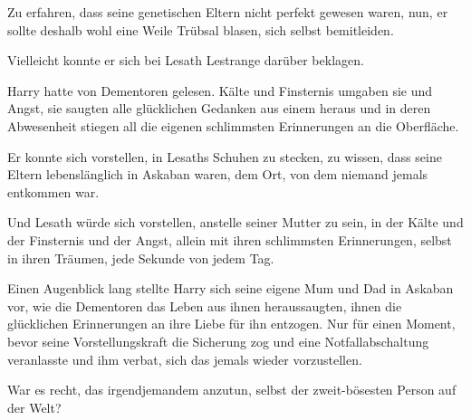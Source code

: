 Zu erfahren, dass seine genetischen Eltern nicht perfekt gewesen waren, nun, er sollte deshalb wohl eine Weile Trübsal blasen, sich selbst bemitleiden.

Vielleicht konnte er sich bei Lesath Lestrange darüber beklagen.

Harry hatte von Dementoren gelesen. Kälte und Finsternis umgaben sie und Angst, sie saugten alle glücklichen Gedanken aus einem heraus und in deren Abwesenheit stiegen all die eigenen schlimmsten Erinnerungen an die Oberfläche.

Er konnte sich vorstellen, in Lesaths Schuhen zu stecken, zu wissen, dass seine Eltern lebenslänglich in Askaban waren, dem Ort, von dem niemand jemals entkommen war.

Und Lesath würde sich vorstellen, anstelle seiner Mutter zu sein, in der Kälte und der Finsternis und der Angst, allein mit ihren schlimmsten Erinnerungen, selbst in ihren Träumen, jede Sekunde von jedem Tag.

Einen Augenblick lang stellte Harry sich seine eigene Mum und Dad in Askaban vor, wie die Dementoren das Leben aus ihnen heraussaugten, ihnen die glücklichen Erinnerungen an ihre Liebe für ihn entzogen. Nur für einen Moment, bevor seine Vorstellungskraft die Sicherung zog und eine Notfallabschaltung veranlasste und ihm verbat, sich das jemals wieder vorzustellen.

War es recht, das irgendjemandem anzutun, selbst der zweit-bösesten Person auf der Welt?

